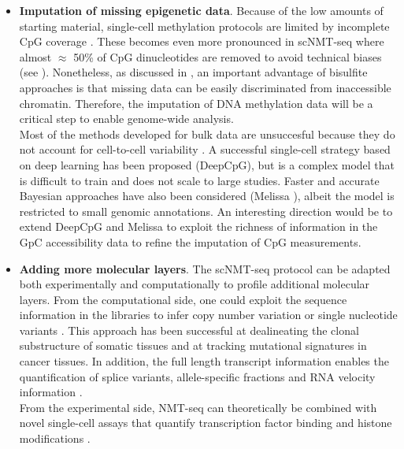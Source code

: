 \begin{itemize}
	\item \textbf{Imputation of missing epigenetic data}. Because of the low amounts of starting material, single-cell methylation protocols are limited by incomplete CpG coverage \cite{Angermueller2017}. These becomes even more pronounced in scNMT-seq where almost $\approx$ 50\% of CpG dinucleotides are removed to avoid technical biases (see ). Nonetheless, as discussed in , an important advantage of bisulfite approaches is that missing data can be easily discriminated from inaccessible chromatin. Therefore, the imputation of DNA methylation data will be a critical step to enable genome-wide analysis.\\
	Most of the methods developed for bulk data are unsuccesful because they do not account for cell-to-cell variability \cite{Angermueller2017}. A successful single-cell strategy based on deep learning has been proposed (DeepCpG\cite{Angermueller2017}), but is a complex model that is difficult to train and does not scale to large studies. Faster and accurate Bayesian approaches have also been considered (Melissa \cite{Kapourani2018b}), albeit the model is restricted to small genomic annotations. An interesting direction would be to extend DeepCpG and Melissa to exploit the richness of information in the GpC accessibility data to refine the imputation of CpG measurements.

	\item \textbf{Adding more molecular layers}. The scNMT-seq protocol can be adapted both experimentally and computationally to profile additional molecular layers. From the computational side, one could exploit the sequence information in the libraries to infer copy number variation or single nucleotide variants \cite{Poirion2018,Fan2018,McCarthy2018,Enge2017}. This approach has been successful at dealineating the clonal substructure of somatic tissues and at tracking mutational signatures in cancer tissues. In addition, the full length transcript information enables the quantification of splice variants\cite{Huang2017}, allele-specific fractions\cite{Deng2014} and RNA velocity information \cite{LaManno2018}.\\
	From the experimental side, NMT-seq can theoretically be combined with novel single-cell assays that quantify transcription factor binding \cite{Moudgil2019} and histone modifications \cite{Kaya-Okur2019}.


\end{itemize}
